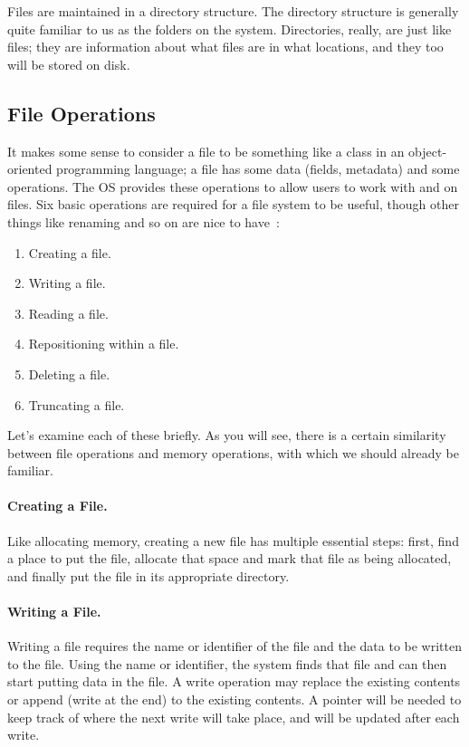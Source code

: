Files are maintained in a directory structure. The directory structure is generally quite familiar to us as the folders on the system. Directories, really, are just like files; they are information about what files are in what locations, and they too will be stored on disk.

\subsection*{File Operations}
It makes some sense to consider a file to be something like a class in an object-oriented programming language; a file has some data (fields, metadata) and some operations. The OS provides these operations to allow users to work with and on files. Six basic operations are required for a file system to be useful, though other things like renaming and so on are nice to have~\cite{osc}:

\begin{enumerate}
	\item Creating a file.
	\item Writing a file.
	\item Reading a file.
	\item Repositioning within a file.
	\item Deleting a file.
	\item Truncating a file.
\end{enumerate}

Let's examine each of these briefly. As you will see, there is a certain similarity between file operations and memory operations, with which we should already be familiar.

\paragraph{Creating a File.} Like allocating memory, creating a new file has multiple essential steps: first, find a place to put the file, allocate that space and mark that file as being allocated, and finally put the file in its appropriate directory.

\paragraph{Writing a File.} Writing a file requires the name or identifier of the file and the data to be written to the file. Using the name or identifier, the system finds that file and can then start putting data in the file. A write operation may replace the existing contents or append (write at the end) to the existing contents. A pointer will be needed to keep track of where the next write will take place, and will be updated after each write.

